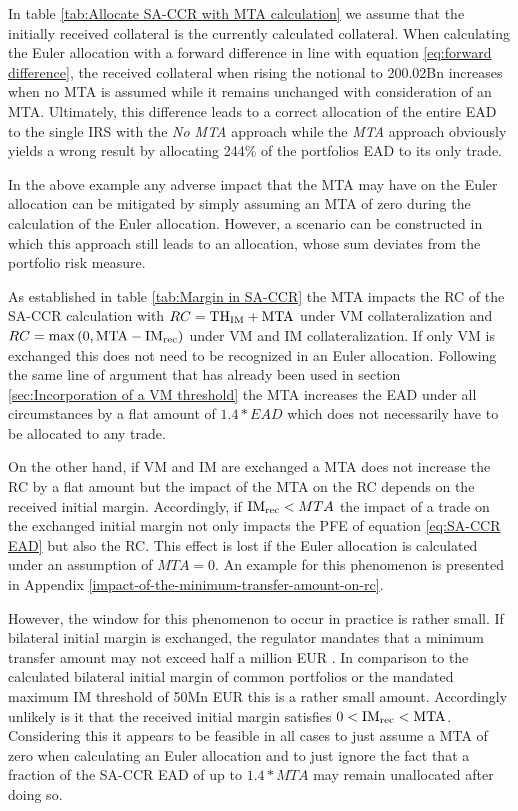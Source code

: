 \documentclass[../Thesis_AHoecherl.tex]{subfiles}
\begin{document}
    In table \ref{tab:Allocate SA-CCR with MTA calculation} we assume that the initially received collateral is the currently calculated collateral. 
    When calculating the Euler allocation with a forward difference in line with equation \ref{eq:forward difference}, the received collateral when rising the notional to 200.02Bn increases when no \gls{MTA} is assumed while it remains unchanged with consideration of an MTA. 
    Ultimately, this difference leads to a correct allocation of the entire \gls{EAD} to the single \gls{IRS} with the \emph{No MTA} approach while the \emph{MTA} approach obviously yields a wrong result by allocating 244\% of the portfolios \gls{EAD} to its only trade.

    In the above example any adverse impact that the \gls{MTA} may have on the Euler allocation can be mitigated by simply assuming an \gls{MTA} of zero during the calculation of the Euler allocation.
    However, a scenario can be constructed in which this approach still leads to an allocation, whose sum deviates from the portfolio risk measure.

    As established in table \ref{tab:Margin in SA-CCR} the \gls{MTA} impacts the RC of the \gls{SA-CCR} calculation with $RC = \text{TH\textsubscript{IM}} + \text{MTA}$ under \gls{VM} collateralization and $RC = \max{\left(0, \text{MTA} - \text{IM\textsubscript{rec}}\right)}$ under \gls{VM} and \gls{IM} collateralization.
    If only \gls{VM} is exchanged this does not need to be recognized in an Euler allocation. Following the same line of argument that has already been used in section \ref{sec:Incorporation of a VM threshold} the \gls{MTA} increases the \gls{EAD} under all circumstances by a flat amount of $1.4*EAD$ which does not necessarily have to be allocated to any trade.

    On the other hand, if \gls{VM} and \gls{IM} are exchanged a \gls{MTA} does not increase the RC by a flat amount but the impact of the \gls{MTA} on the RC depends on the received initial margin. Accordingly, if $\text{IM\textsubscript{rec}} < MTA$ the impact of a trade on the exchanged initial margin not only impacts the PFE of equation \ref{eq:SA-CCR EAD} but also the RC. This effect is lost if the Euler allocation is calculated under an assumption of $MTA = 0$. An example for this phenomenon is presented in Appendix \ref{impact-of-the-minimum-transfer-amount-on-rc}.

    However, the window for this phenomenon to occur in practice is rather small. If bilateral initial margin is exchanged, the regulator mandates that a minimum transfer amount may not exceed half a million EUR \cite[Requirement 2.3]{BCBS_MarginRequirements}.
    In comparison to the calculated bilateral initial margin of common portfolios or the mandated maximum \gls{IM} threshold of 50Mn EUR \cite[Requirement 2.2]{BCBS_MarginRequirements} this is a rather small amount.
    Accordingly unlikely is it that the received initial margin satisfies $0<\text{IM\textsubscript{rec}}<\text{MTA}$.
    Considering this it appears to be feasible in all cases to just assume a \gls{MTA} of zero when calculating an Euler allocation and to just ignore the fact that a fraction of the \gls{SA-CCR} \gls{EAD} of up to $1.4*MTA$ may remain unallocated after doing so.
\end{document}
